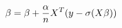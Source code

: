 \documentclass[preview]{standalone}
\begin{document}
\begin{align*}
\special{dvisvgm:raw <g id='unique000'>}\beta=\beta+\frac{\alpha}{n}X^T(y-\sigma(X\beta))\special{dvisvgm:raw </g>}
\end{align*}
\end{document}

